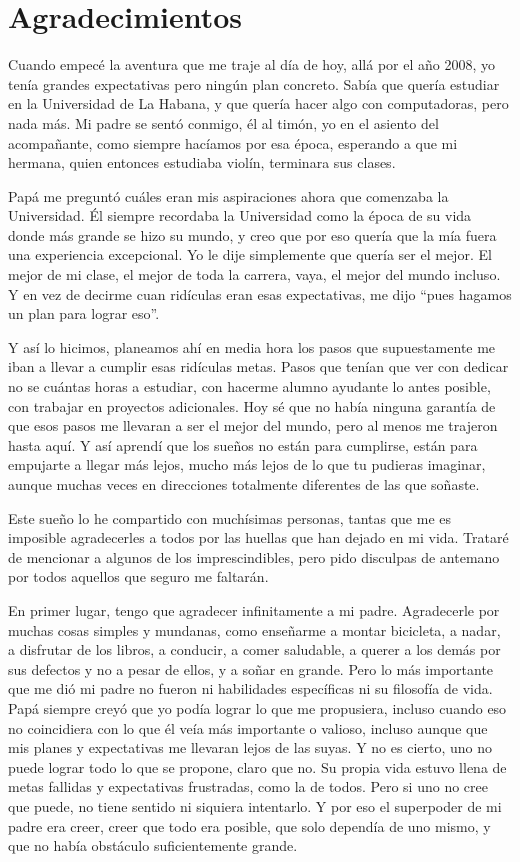 \chapter*{Agradecimientos}
{}

Cuando empecé la aventura que me traje al día de hoy, allá por el año 2008, yo tenía grandes expectativas pero ningún plan concreto.
Sabía que quería estudiar en la Universidad de La Habana, y que quería hacer algo con computadoras, pero nada más.
Mi padre se sentó conmigo, él al timón, yo en el asiento del acompañante, como siempre hacíamos por esa época, esperando a que mi hermana, quien entonces estudiaba violín, terminara sus clases.

Papá me preguntó cuáles eran mis aspiraciones ahora que comenzaba la Universidad.
Él siempre recordaba la Universidad como la época de su vida donde más grande se hizo su mundo, y creo que por eso quería que la mía fuera una experiencia excepcional.
Yo le dije simplemente que quería ser el mejor. El mejor de mi clase, el mejor de toda la carrera, vaya, el mejor del mundo incluso.
Y en vez de decirme cuan ridículas eran esas expectativas, me dijo ``pues hagamos un plan para lograr eso''.

Y así lo hicimos, planeamos ahí en media hora los pasos que supuestamente me iban a llevar a cumplir esas ridículas metas. Pasos que tenían que ver con dedicar no se cuántas horas a estudiar, con hacerme alumno ayudante lo antes posible, con trabajar en proyectos adicionales.
Hoy sé que no había ninguna garantía de que esos pasos me llevaran a ser el mejor del mundo, pero al menos me trajeron hasta aquí.
Y así aprendí que los sueños no están para cumplirse, están para empujarte a llegar más lejos, mucho más lejos de lo que tu pudieras imaginar, aunque muchas veces en direcciones totalmente diferentes de las que soñaste.

Este sueño lo he compartido con muchísimas personas, tantas que me es imposible agradecerles a todos por las huellas que han dejado en mi vida. Trataré de mencionar a algunos de los imprescindibles, pero pido disculpas de antemano por todos aquellos que seguro me faltarán.

En primer lugar, tengo que agradecer infinitamente a mi padre. Agradecerle por muchas cosas simples y mundanas, como enseñarme a montar bicicleta, a nadar, a disfrutar de los libros, a conducir, a comer saludable, a querer a los demás por sus defectos y no a pesar de ellos, y a soñar en grande.
Pero lo más importante que me dió mi padre no fueron ni habilidades específicas ni su filosofía de vida.
Papá siempre creyó que yo podía lograr lo que me propusiera, incluso cuando eso no coincidiera con lo que él veía más importante o valioso, incluso aunque que mis planes y expectativas me llevaran lejos de las suyas.
Y no es cierto, uno no puede lograr todo lo que se propone, claro que no.
Su propia vida estuvo llena de metas fallidas y expectativas frustradas, como la de todos.
Pero si uno no cree que puede, no tiene sentido ni siquiera intentarlo.
Y por eso el superpoder de mi padre era creer, creer que todo era posible, que solo dependía de uno mismo, y que no había obstáculo suficientemente grande.

